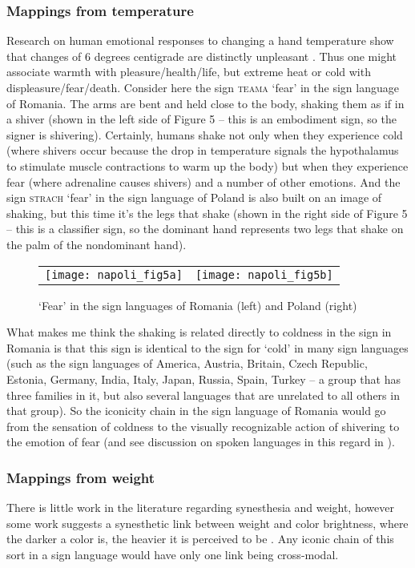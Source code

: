 \documentclass[output=paper,
modfonts
]{LSP/langsci}
\begin{document}
\subsubsection{Mappings from temperature} Research on human emotional responses
to changing a hand temperature show that changes of 6 degrees centigrade
are distinctly unpleasant \citep{salminen2013}. Thus one might
associate warmth with pleasure/health/life, but extreme heat or cold
with displeasure/fear/death. Consider here the sign \textsc{teama}
`fear' in the sign language of Romania. The arms are bent and held close
to the body, shaking them as if in a shiver (shown in the left side of
Figure 5 -- this is an embodiment sign, so the signer is shivering).
Certainly, humans shake not only when they experience cold (where
shivers occur because the drop in temperature signals the hypothalamus
to stimulate muscle contractions to warm up the body) but when they
experience fear (where adrenaline causes shivers) and a number of other
emotions. And the sign \textsc{strach} `fear' in the sign language of
Poland is also built on an image of shaking, but this time it's the legs
that shake (shown in the right side of Figure 5 -- this is a classifier
sign, so the dominant hand represents two legs that shake on the palm of
the nondominant hand).

\begin{figure}
	\begin{tabularx}{\textwidth}{CC}
		\texttt{[image: napoli\_fig5a]} & \texttt{[image: napoli\_fig5b]}\\
	\end{tabularx}
	\caption{`Fear' in the sign languages of Romania (left) and Poland (right)}
	\label{fig:5n}
\end{figure}

What makes me think the shaking is related directly to coldness in the
sign in Romania is that this sign is identical to the sign for `cold' in
many sign languages (such as the sign languages of America, Austria,
Britain, Czech Republic, Estonia, Germany, India, Italy, Japan, Russia,
Spain, Turkey -- a group that has three families in it, but also several
languages that are unrelated to all others in that group). So the
iconicity chain in the sign language of Romania would go from the
sensation of coldness to the visually recognizable action of shivering
to the emotion of fear (and see discussion on spoken languages in this
regard in \citealt{atkins1995}).

\subsubsection{Mappings from weight} There is little work in the literature
regarding synesthesia and weight, however some work suggests a
synesthetic link between weight and color brightness, where the darker a
color is, the heavier it is perceived to be \citep{ward2008}. Any iconic chain of this sort in a sign language would have only
one link being cross-modal.
\end{document}
